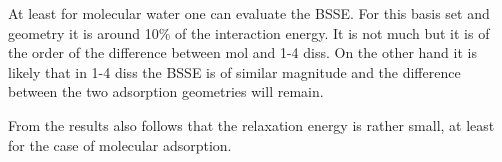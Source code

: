 \documentclass[11pt,DIV=13,BCOR=5mm,a4paper,headinclude]{scrbook}
\begin{document}
At least for molecular water one can evaluate the BSSE.
For this basis set and geometry it is around 10$\%$ of the interaction
energy.
It is not much but it is of the order of the difference between mol and 1-4 diss.
On the other hand it is likely that in 1-4 diss the BSSE is of similar magnitude and the difference between the two adsorption geometries will remain.


From the results also follows that the relaxation energy is rather small, at least for the case of molecular adsorption. %


\end{document}
